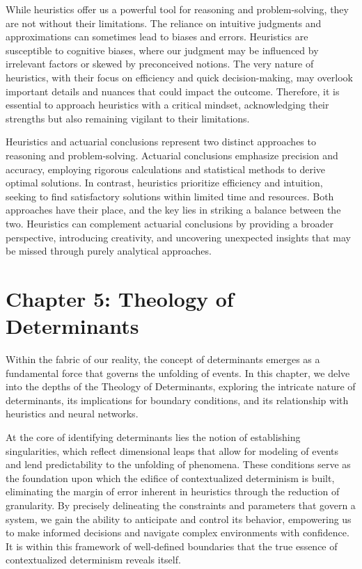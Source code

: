\documentclass[ebook,12pt,oneside,openany]{memoir}
\begin{document}
\indent While heuristics offer us a powerful tool for reasoning and problem-solving, they are not without their limitations. The reliance on intuitive judgments and approximations can sometimes lead to biases and errors. Heuristics are susceptible to cognitive biases, where our judgment may be influenced by irrelevant factors or skewed by preconceived notions. The very nature of heuristics, with their focus on efficiency and quick decision-making, may overlook important details and nuances that could impact the outcome. Therefore, it is essential to approach heuristics with a critical mindset, acknowledging their strengths but also remaining vigilant to their limitations.

\indent Heuristics and actuarial conclusions represent two distinct approaches to reasoning and problem-solving. Actuarial conclusions emphasize precision and accuracy, employing rigorous calculations and statistical methods to derive optimal solutions. In contrast, heuristics prioritize efficiency and intuition, seeking to find satisfactory solutions within limited time and resources. Both approaches have their place, and the key lies in striking a balance between the two. Heuristics can complement actuarial conclusions by providing a broader perspective, introducing creativity, and uncovering unexpected insights that may be missed through purely analytical approaches.
\chapter*{Chapter 5: Theology of Determinants}


\indent \indent Within the fabric of our reality, the concept of determinants emerges as a fundamental force that governs the unfolding of events. In this chapter, we delve into the depths of the Theology of Determinants, exploring the intricate nature of determinants, its implications for boundary conditions, and its relationship with heuristics and neural networks.

\indent At the core of identifying determinants lies the notion of establishing singularities, which reflect dimensional leaps that allow for modeling of events and lend predictability to the unfolding of phenomena. These conditions serve as the foundation upon which the edifice of contextualized determinism is built, eliminating the margin of error inherent in heuristics through the reduction of granularity. By precisely delineating the constraints and parameters that govern a system, we gain the ability to anticipate and control its behavior, empowering us to make informed decisions and navigate complex environments with confidence. It is within this framework of well-defined boundaries that the true essence of contextualized determinism reveals itself.
\end{document}
